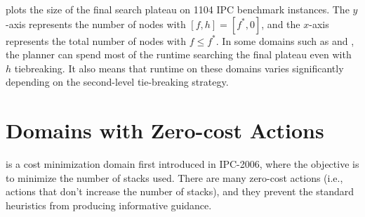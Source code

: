  plots the size of the final search plateau on 1104 IPC
benchmark instances.
The $y$-axis
represents the number of nodes with $[f,h]=[f^*,0]$, and the $x$-axis represents the total
number of nodes with $f\leq f^*$.
In some domains such as  and , the planner can spend most of the runtime
searching the final plateau even with $h$ tiebreaking.
It also
means that runtime on these domains varies significantly depending on the second-level tie-breaking strategy.




\section{Domains with Zero-cost Actions}
\label{sec:zerocost-domains}
  is a cost
minimization domain first introduced in IPC-2006, where the objective is to 
minimize the number of stacks used.
There are many zero-cost actions (i.e., actions that don't increase the number of stacks), and
they prevent the standard heuristics from producing
informative guidance.




